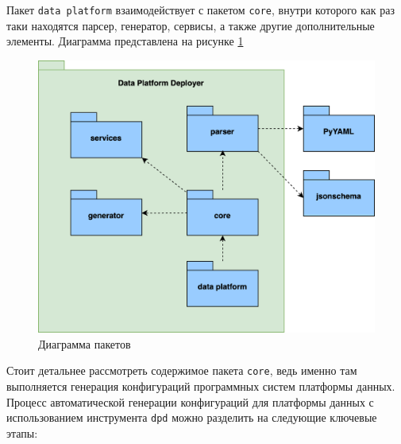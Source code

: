 Пакет \texttt{data platform} взаимодействует с пакетом \texttt{core}, внутри которого как раз таки находятся парсер, генератор, сервисы, а также другие дополнительные элементы.
Диаграмма представлена на рисунке \ref{fig:diagram_package}

\begin{figure}
    \center
    \includegraphics [scale=0.4] {my_folder/images/diagram_package}
    \caption{Диаграмма пакетов}
    \label{fig:diagram_package}
\end{figure}
\FloatBarrier
Стоит детальнее рассмотреть содержимое пакета \texttt{core}, ведь именно там выполняется генерация конфигураций программных систем платформы данных.
Процесс автоматической генерации конфигураций для платформы данных с использованием инструмента \texttt{dpd} можно разделить на следующие ключевые этапы:
